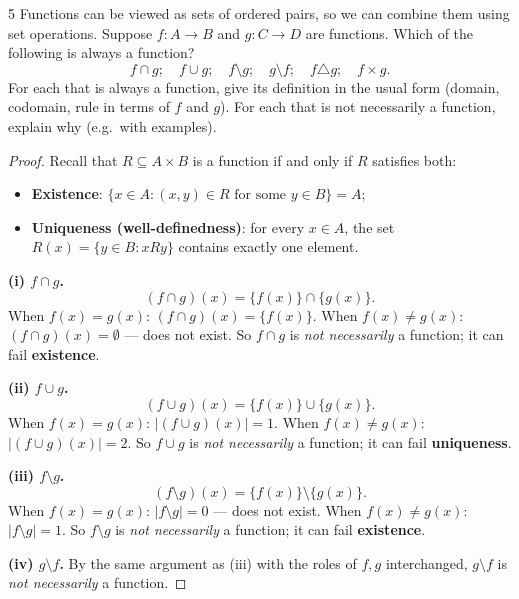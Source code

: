 \begin{exercise}{5}
    Functions can be viewed as sets of ordered pairs, so we can combine them
    using set operations. Suppose $f:A\to B$ and $g:C\to D$ are functions. Which
    of the following is always a function?
    \[
        f\cap g;\quad f\cup g;\quad f\setminus g;\quad g\setminus f;\quad
        f\triangle g;\quad f\times g.
    \]
    For each that is always a function, give its definition in the usual form
    (domain, codomain, rule in terms of $f$ and $g$). For each that is not
    necessarily a function, explain why (e.g.\ with examples).
\end{exercise}
\begin{solbox}
\begin{proof}
    Recall that $R\subseteq A\times B$ is a function if and only if
    $R$ satisfies both:
    \begin{itemize}
        \item \textbf{Existence}: $\{x\in A : (x,y)\in R \text{ for
            some } y\in B\} = A$;
        \item \textbf{Uniqueness (well-definedness)}: for every
            $x\in A$, the set $R(x)=\{y\in B : xRy\}$ contains
            exactly one element.
    \end{itemize}

    \medskip
    \textbf{(i) $f\cap g$.}
    \[
        (f\cap g)(x) = \{f(x)\}\cap\{g(x)\}.
    \]
    When $f(x)=g(x)$: $(f\cap g)(x) = \{f(x)\}$.
    When $f(x)\ne g(x)$: $(f\cap g)(x) = \emptyset$ --- does not
    exist. So $f\cap g$ is \emph{not necessarily} a function; it can
    fail \textbf{existence}.

    \medskip
    \textbf{(ii) $f\cup g$.} \label{5ii}
    \[
        (f\cup g)(x) = \{f(x)\}\cup\{g(x)\}.
    \]
    When $f(x)=g(x)$: $|(f\cup g)(x)|=1$.
    When $f(x)\ne g(x)$: $|(f\cup g)(x)|=2$. So $f\cup g$ is
    \emph{not necessarily} a function; it can fail
    \textbf{uniqueness}.

    \medskip
    \textbf{(iii) $f\setminus g$.}
    \[
        (f\setminus g)(x) = \{f(x)\}\setminus\{g(x)\}.
    \]
    When $f(x)=g(x)$: $|f\setminus g|=0$ --- does not exist.
    When $f(x)\ne g(x)$: $|f\setminus g|=1$. So $f\setminus g$ is
    \emph{not necessarily} a function; it can fail
    \textbf{existence}.

    \medskip
    \textbf{(iv) $g\setminus f$.}
    By the same argument as (iii) with the roles of $f,g$
    interchanged, $g\setminus f$ is \emph{not necessarily} a
    function.


\end{proof}
\end{solbox}
